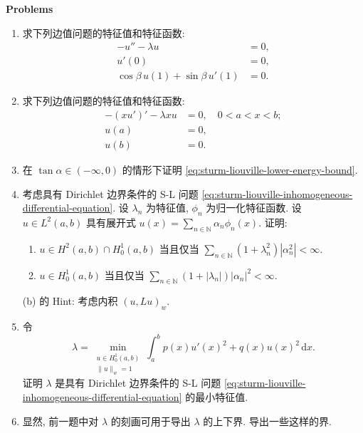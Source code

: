 \textbf{Problems}

\begin{enumerate}[label=\thesection.\arabic*.,ref=\thesection.\arabic*,start=48,series=book-problems]

\item\label{ex:sturm-liouville-neumann-robin-spectrum} 求下列边值问题的特征值和特征函数:\[\begin{aligned}
-u''-\lambda u&=0,\\
u'(0)&=0,\\
\cos\beta\,u(1)+\sin\beta\,u'(1)&=0.
\end{aligned}\]

\item\label{ex:sturm-liouville-weight-x-dirichlet-spectrum} 求下列边值问题的特征值和特征函数:\[\begin{aligned}
-(xu')'-\lambda xu&=0,\quad0<a<x<b;\\
u(a)&=0,\\
u(b)&=0.
\end{aligned}\]

\item\label{ex:sturm-liouville-general-energy-bound} 在 $\tan\alpha\in(-\infty,0)$ 的情形下证明 \eqref{eq:sturm-liouville-lower-energy-bound}.

\item\label{ex:sturm-liouville-spectral-sobolev-characterizations} 考虑具有 Dirichlet 边界条件的 S-L 问题 \eqref{eq:sturm-liouville-inhomogeneous-differential-equation}. 设 $\lambda_n$ 为特征值, $\phi_n$ 为归一化特征函数. 设 $u\in L^2(a,b)$ 具有展开式 $u(x)=\sum_{n\in\mathbb{N}}\alpha_n\phi_n(x)$. 证明:\begin{enumerate}[label=(\alph*)]\item $u\in H^2(a,b)\cap H_0^1(a,b)$ 当且仅当 $\sum_{n\in\mathbb{N}}(1+\lambda_n^2)|\alpha_n^2|<\infty$.\item $u\in H_0^1(a,b)$ 当且仅当 $\sum_{n\in\mathbb{N}}(1+|\lambda_n|)|\alpha_n|^2<\infty$.\end{enumerate}(b) 的 Hint: 考虑内积 $(u,Lu)_w$.

\item\label{ex:sturm-liouville-smallest-eigenvalue-variational-characterization} 令
\begin{equation}\label{eq:sturm-liouville-first-eigenvalue-variational-problem}
\lambda=\min_{\substack{u\in H_0^1(a,b)\\\|u\|_w=1}}\int_a^bp(x)u'(x)^2+q(x)u(x)^2\,\mathrm{d}x.
\end{equation}
证明 $\lambda$ 是具有 Dirichlet 边界条件的 S-L 问题 \eqref{eq:sturm-liouville-inhomogeneous-differential-equation} 的最小特征值.

\item\label{ex:sturm-liouville-variational-eigenvalue-bounds} 显然, 前一题中对 $\lambda$ 的刻画可用于导出 $\lambda$ 的上下界. 导出一些这样的界.

\end{enumerate}
